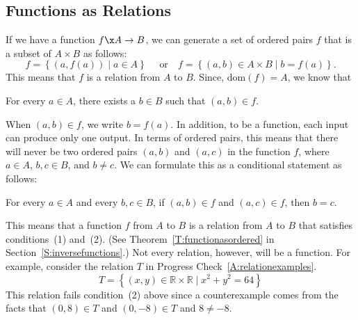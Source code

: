 \subsection*{Functions as Relations}
If we have a function  $f\x A \to B$, we can generate a set of ordered pairs  $f$  that is a subset of  $A \times B$ as follows:
\[
  f = \left\{ { {\left( {a, f( a )} \right) } \mid a \in A} \right\} \quad \text{ or}  
  \quad f = \left\{ {( {a, b} ) \in A \times B   \mid b = f( a )} \right\}.  
\]
\setcounter{equation}{0}
This means that  $f$  is a relation from  $A$  to  $B$.  Since,  
$\text{dom}( f ) = A$, we know that
\begin{list}{(1)}
\item For every $a \in A$, there exists a $b \in B$ such that $( a, b ) \in f$.
\end{list}
\vskip6pt
\noindent
When $\left( a, b \right) \in f$, we write  $b = f( a )$.  In addition, to be a function, each input can produce only one output.  In terms of ordered pairs, this means that there will never be two ordered pairs   
$( {a, b} )$ and  $( {a, c} )$  in the function  $f$,  where  $a \in A$, $b, c \in B$, and  $b \ne c$.  We can formulate this as a conditional statement as follows:
\begin{list}{(2)}
\item For every $a \in A$ and every $b, c \in B$, if $( a, b ) \in f$ and 
$(a, c ) \in f$, then $b = c$.
\end{list}
\vskip6pt
\noindent
This means that a function  $f$  from  $A$  to  $B$  is a relation from  $A$  to  $B$  that satisfies conditions~(1)
and~(2).  
(See Theorem~\ref{T:functionasordered} in Section~\ref{S:inversefunctions}.)  Not every relation, however, will be a function.  For example, consider the relation $T$ in Progress Check~\ref{A:relationexamples}.
\[
T = \left\{ {\left( {x, y} \right) \in \mathbb{R} \times \mathbb{R}   \mid x^2  + y^2  = 64} \right\}
\]
This relation fails condition~(2) above since a counterexample comes from the facts that  
$(0, 8) \in T$ and $(0, -8) \in T$ and $8 \ne -8$.
\hbreak

